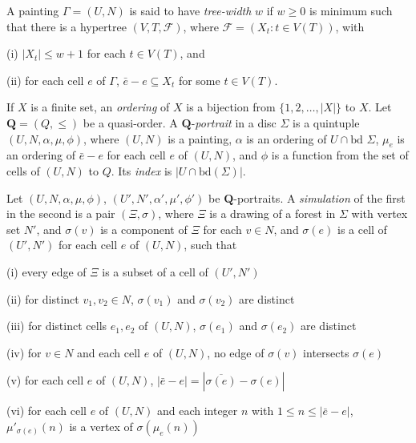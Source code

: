 A painting $\Gamma = (U, N)$ is said to have \textit{tree-width} $w$ if $w \ge 0$ is minimum such that there is a hypertree $(V, T, \mathscr{F})$, where $\mathscr{F} = (X_t : t \in V(T))$, with

\hspace*{12pt}(i) $|X_t| \le w + 1$ for each $t \in V(T)$, and

\hspace*{12pt}(ii) for each cell $e$ of $\Gamma$, $\bar{e} - e \subseteq X_t$ for some $t \in V(T)$.

If $X$ is a finite set, an \textit{ordering} of $X$ is a bijection from $\{1, 2, \dots, |X|\}$ to $X$. Let $\mathbf{Q} = (Q, \le)$ be a quasi-order. A $\mathbf{Q}$-\textit{portrait} in a disc $\Sigma$ is a quintuple $(U, N, \alpha, \mu, \phi)$, where $(U, N)$ is a painting, $\alpha$ is an ordering of $U \cap \text{bd } \Sigma$, $\mu_e$ is an ordering of $\bar{e} - e$ for each cell $e$ of $(U, N)$, and $\phi$ is a function from the set of cells of $(U, N)$ to $Q$. Its \textit{index} is $|U \cap \text{bd}(\Sigma)|$.

Let $(U, N, \alpha, \mu, \phi)$, $(U', N', \alpha', \mu', \phi')$ be $\mathbf{Q}$-portraits. A \textit{simulation} of the first in the second is a pair $(\Xi, \sigma)$, where $\Xi$ is a drawing of a forest in $\Sigma$ with vertex set $N'$, and $\sigma(v)$ is a component of $\Xi$ for each $v \in N$, and $\sigma(e)$ is a cell of $(U', N')$ for each cell $e$ of $(U, N)$, such that

\hspace*{12pt}(i) every edge of $\Xi$ is a subset of a cell of $(U', N')$

\hspace*{12pt}(ii) for distinct $v_1, v_2 \in N$, $\sigma(v_1)$ and $\sigma(v_2)$ are distinct

\hspace*{12pt}(iii) for distinct cells $e_1, e_2$ of $(U, N)$, $\sigma(e_1)$ and $\sigma(e_2)$ are distinct

\hspace*{12pt}(iv) for $v \in N$ and each cell $e$ of $(U, N)$, no edge of $\sigma(v)$ intersects $\sigma(e)$

\hspace*{12pt}(v) for each cell $e$ of $(U, N)$, $|\bar{e} - e| = |\overline{\sigma(e)} - \sigma(e)|$

\hspace*{12pt}(vi) for each cell $e$ of $(U, N)$ and each integer $n$ with $1 \le n \le |\bar{e} - e|$, $\mu'_{\sigma(e)}(n)$ is a vertex of $\sigma(\mu_e(n))$

